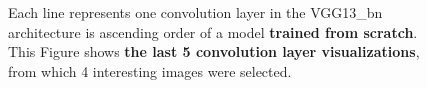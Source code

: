 \begin{figure}[!h]
\centering
\caption{Each line represents one convolution layer in the VGG13\_bn architecture is ascending order of a model \textbf{trained from scratch}. This Figure shows \textbf{the last 5 convolution layer visualizations}, from which 4 interesting images were selected.}



\end{figure}
